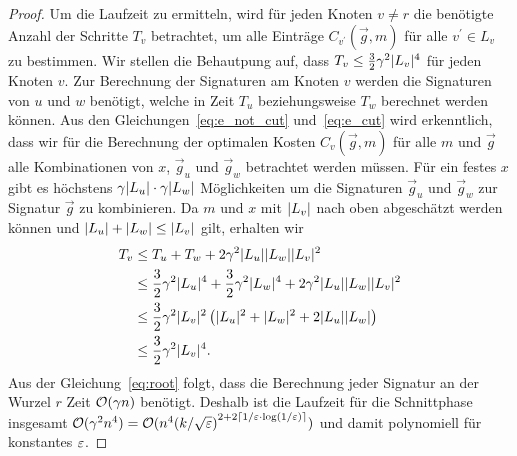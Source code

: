 \begin{proof}
    Um die Laufzeit zu ermitteln, wird für jeden Knoten $v \neq r$ die benötigte Anzahl der Schritte $T_v$ betrachtet, um alle Einträge $C_{v^\prime}(\vec{g}, m)$ für alle $v^\prime \in L_v$ zu bestimmen. 
    Wir stellen die Behautpung auf, dass $T_v \leq \frac{3}{2} \gamma^2 \lvert L_v\rvert^4$ für jeden Knoten $v$.
    Zur Berechnung der Signaturen am Knoten $v$ werden die Signaturen von $u$ und $w$ benötigt, welche in Zeit $T_u$ beziehungsweise $T_w$ berechnet werden können.
    Aus den Gleichungen~\eqref{eq:e_not_cut} und~\eqref{eq:e_cut} wird erkenntlich, dass wir für die Berechnung der optimalen Kosten $C_v(\vec{g}, m)$ für alle $m$ und $\vec{g}$ alle Kombinationen von $x$, $\vec{g}_u$ und $\vec{g}_w$ betrachtet werden müssen.
    Für ein festes $x$ gibt es höchstens $\gamma \lvert L_u\rvert \cdot \gamma \lvert L_w\rvert$ Möglichkeiten um die Signaturen $\vec{g}_u$ und $\vec{g}_w$ zur Signatur $\vec{g}$ zu kombinieren.
    Da $m$ und $x$ mit $\lvert L_v\rvert$ nach oben abgeschätzt werden können und $\lvert L_u\rvert + \lvert L_w\rvert \leq \lvert L_v\rvert$ gilt, erhalten wir
    \begin{equation*}
        \begin{aligned}
            T_v & \leq T_u + T_w + 2\gamma^2 \lvert L_u\rvert \lvert L_w\rvert \lvert L_v\rvert^2 \\
                & \leq \frac{3}{2} \gamma^2 \lvert L_u\rvert^4 + \frac{3}{2} \gamma^2 \lvert L_w\rvert^4 + 2\gamma^2 \lvert L_u\rvert \lvert L_w\rvert \lvert L_v\rvert^2 \\
                & \leq \frac{3}{2} \gamma^2 \lvert L_v\rvert^2 \left(\lvert L_u\rvert^2 + \lvert L_w\rvert^2 + 2 \lvert L_u\rvert \lvert L_w\rvert \right) \\
                & \leq \frac{3}{2} \gamma^2 \lvert L_v\rvert^4.
        \end{aligned}
    \end{equation*}
    Aus der Gleichung~\eqref{eq:root} folgt, dass die Berechnung jeder Signatur an der Wurzel $r$ Zeit $\mathcal{O}(\gamma n)$ benötigt.
    Deshalb ist die Laufzeit für die Schnittphase insgesamt $\mathcal{O}(\gamma^2 n^4) = \mathcal{O}(n^4{(k/\sqrt{\varepsilon})}^{2+2 \lceil1/\varepsilon \cdot \log(1/\varepsilon)\rceil})$ und damit polynomiell für konstantes $\varepsilon$.
\end{proof}


